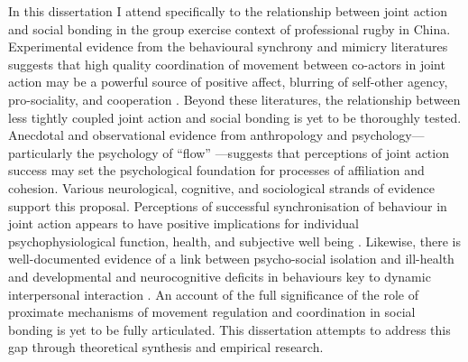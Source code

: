 In this dissertation I attend specifically to the relationship between joint action and social bonding in the group exercise context of professional rugby in China.  Experimental evidence from the behavioural synchrony and mimicry literatures suggests that high quality coordination of movement between co-actors in joint action may be a powerful source of positive affect, blurring of self-other agency, pro-sociality, and cooperation \citep{Mogan2017}.  Beyond these literatures, the relationship between less tightly coupled joint action and social bonding is yet to be thoroughly tested. Anecdotal and observational evidence from anthropology and psychology---particularly the psychology of ``flow'' \citep{Csikszentmihalyi1992,Jackson1999}---suggests that perceptions of joint action success may set the psychological foundation for processes of affiliation and cohesion.
Various neurological, cognitive, and sociological strands of evidence support this proposal.  Perceptions of successful synchronisation of behaviour in joint action appears to have positive implications for individual psychophysiological function, health, and subjective well being \citep{Wheatley2012}.  Likewise, there is well-documented evidence of a link between psycho-social isolation and ill-health and developmental and neurocognitive deficits in behaviours key to dynamic interpersonal interaction \citep[e.g.][]{Blakemore2005,Baron-Cohen1991}. An account of the full significance of the role of proximate mechanisms of movement regulation and coordination in social bonding is yet to be fully articulated. This dissertation attempts to address this gap through theoretical synthesis and empirical research.



